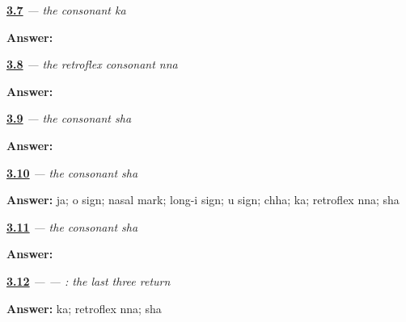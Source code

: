 \noindent\begin{minipage}[t]{\linewidth}
\raggedright
\hyperlink{review-GU-W03-ka-recall}{\textbf{3.7}} \emph{ — the consonant ka}\par
\small \textbf{Answer:} \par
\end{minipage}\par\medskip

\noindent\begin{minipage}[t]{\linewidth}
\raggedright
\hyperlink{review-GU-W03-nna-recall}{\textbf{3.8}} \emph{ — the retroflex consonant nna}\par
\small \textbf{Answer:} \par
\end{minipage}\par\medskip

\noindent\begin{minipage}[t]{\linewidth}
\raggedright
\hyperlink{review-GU-W03-sha-recall}{\textbf{3.9}} \emph{ — the consonant sha}\par
\small \textbf{Answer:} \par
\end{minipage}\par\medskip

\noindent\begin{minipage}[t]{\linewidth}
\raggedright
\hyperlink{review-GU-W03-sha-doorway-reading}{\textbf{3.10}} \emph{ — the consonant sha}\par
\small \textbf{Answer:} ja; o sign; nasal mark; long-i sign; u sign; chha; ka; retroflex nna; sha\par
\end{minipage}\par\medskip

\noindent\begin{minipage}[t]{\linewidth}
\raggedright
\hyperlink{review-GU-W03-sha-doorway-dictation}{\textbf{3.11}} \emph{ — the consonant sha}\par
\small \textbf{Answer:}         \par
\end{minipage}\par\medskip

\noindent\begin{minipage}[t]{\linewidth}
\raggedright
\hyperlink{review-GU-R03-doorway-three-r1-reading}{\textbf{3.12}} \emph{ —  — : the last three return}\par
\small \textbf{Answer:} ka; retroflex nna; sha\par
\end{minipage}\par\medskip

